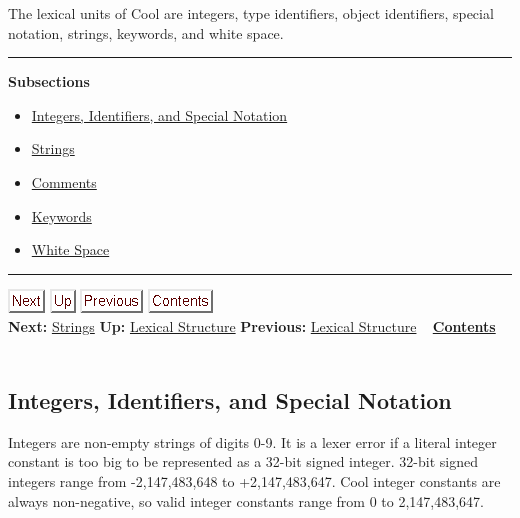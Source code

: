 \documentclass[]{article}
\begin{document}
The lexical units of Cool are integers, type identifiers, object
identifiers, special notation, strings, keywords, and white space.

\begin{center}\rule{3in}{0.4pt}\end{center}

\textbf{Subsections}

\begin{itemize}
\itemsep1pt\parskip0pt
\item
  \href{node34.html}{Integers, Identifiers, and Special Notation}
\item
  \href{node35.html}{Strings}
\item
  \href{node36.html}{Comments}
\item
  \href{node37.html}{Keywords}
\item
  \href{node38.html}{White Space}
\end{itemize}

\begin{center}\rule{3in}{0.4pt}\end{center}

\href{node35.html}{\includegraphics{next.png}}
\href{node33.html}{\includegraphics{up.png}}
\href{node33.html}{\includegraphics{prev.png}}
\href{node1.html}{\includegraphics{contents.png}} \\ \textbf{Next:}
\href{node35.html}{Strings} \textbf{Up:} \href{node33.html}{Lexical
Structure} \textbf{Previous:} \href{node33.html}{Lexical Structure} ~
\textbf{\href{node1.html}{Contents}} \\ \\

\subsection{Integers, Identifiers, and Special Notation}

Integers are non-empty strings of digits 0-9. It is a lexer error if a
literal integer constant is too big to be represented as a 32-bit signed
integer. 32-bit signed integers range from -2,147,483,648 to
+2,147,483,647. Cool integer constants are always non-negative, so valid
integer constants range from 0 to 2,147,483,647.
\end{document}
